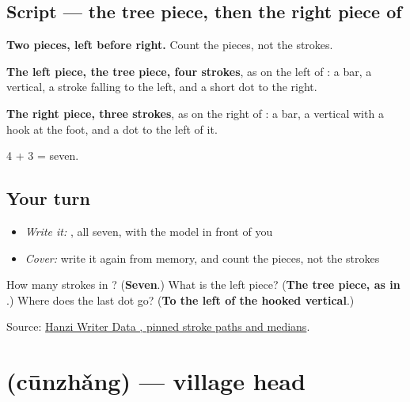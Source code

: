 \subsection*{Script — the tree piece, then the right piece of }

\begin{quote}
\end{quote}

\textbf{Two pieces, left before right.} Count the pieces, not the strokes.

\textbf{The left piece, the tree piece, four strokes}, as on the left of : a bar, a vertical, a stroke falling to the left, and a short dot to the right.

\textbf{The right piece, three strokes}, as on the right of : a bar, a vertical with a hook at the foot, and a dot to the left of it.

4 + 3 = seven.

\subsection*{Your turn}
\begin{itemize}
\raggedright
  \item \emph{Write it:} , all seven, with the model in front of you
  \item \emph{Cover:} write it again from memory, and count the pieces, not the strokes
\end{itemize}

\begin{tcolorbox}[breakable,colback=teal!4,colframe=teal!35!black,title={Before you move on}]
How many strokes in ? (\textbf{Seven}.) What is the left piece? (\textbf{The tree piece, as in }.) Where does the last dot go? (\textbf{To the left of the hooked vertical}.)

Source: \href{https://raw.githubusercontent.com/chanind/hanzi-writer-data/68d10a4b21150cae5e1ebbd223eed289cf32d90c/data/\%E6\%9D\%91.json}{Hanzi Writer Data , pinned stroke paths and medians}.
\end{tcolorbox}
\section[\texorpdfstring{\zh{村长} (cūnzhǎng)}{村长 (cūnzhǎng)}]{ (cūnzhǎng) — village head}

